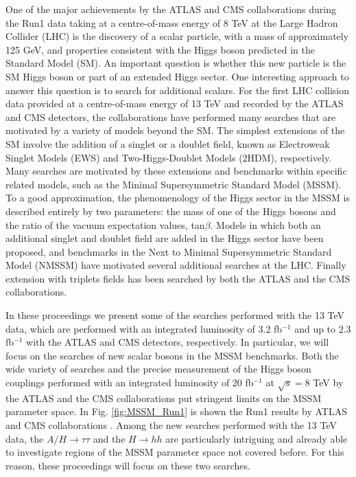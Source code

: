 One of the major achievements by the ATLAS \cite{Aad:2008zzm} and CMS \cite{Chatrchyan:2008aa} collaborations during the Run1 data taking at a centre-of-mass energy of 8 TeV  at the Large Hadron Collider (LHC) is the discovery of a scalar particle, with a mass of approximately 125 GeV, and properties  consistent with the Higgs boson predicted in the Standard Model (SM). 
 An important question is whether this new particle is the SM Higgs boson or part of an extended Higgs sector. One interesting approach to answer this question is to search for additional scalars.
For the first LHC collision data provided at a centre-of-mass energy of 13 TeV and recorded
by the ATLAS and CMS detectors, the collaborations have performed many searches that are
motivated by a variety of models beyond the SM. The simplest extensions of the SM involve the
addition of a singlet or a doublet field, known as Electroweak Singlet Models (EWS)
and Two-Higgs-Doublet Models (2HDM), respectively. Many searches are motivated by these
extensions and benchmarks within specific related models, such as the Minimal Supersymmetric
Standard Model (MSSM). To a good approximation, the phenomenology of the Higgs sector in the MSSM is described entirely by two parameters: the mass of one of the Higgs bosons and the ratio of the vacuum
expectation values, tan$\beta$. Models in which both an additional singlet and doublet field are added in the Higgs sector have been proposed, and benchmarks in the Next to Minimal Supersymmetric
Standard Model (NMSSM) have motivated several additional searches at the LHC. Finally extension with triplets fields has been searched by both the ATLAS and the CMS collaborations.

In these proceedings we present some of the searches performed with the 13 TeV
data, which are performed with an integrated luminosity of 3.2 fb$^{-1}$ and up to 2.3 fb$^{-1}$ with the
ATLAS \cite{ATLAS-CONF-2015-061,HH_bbbb_ATLAS,HH_bbgg_ATLAS,chargedH_tb_ATLAS,chargedH_tuanu_ATLAS} and CMS \cite{HH_bbtautau_CMS,HH_bbWW_CMS,HH_bbbb_CMS} detectors, respectively. In particular, we will focus on the searches of new scalar bosons in the MSSM benchmarks. Both the wide variety of searches and the precise measurement of the Higgs boson couplings  performed with an integrated luminosity of  20 fb$^{-1}$ at $\sqrt{s}=$8 TeV by the ATLAS \cite{aa3photon} and the CMS \cite{Hmumu_ref_CMS,Hbb_ref_CMS,chargedH_tb_CMS,diChargedH} collaborations put stringent limits on the MSSM parameter space. In Fig. \ref{fig:MSSM_Run1} is shown the Run1 results by ATLAS and CMS collaborations \cite{Aad2015,CMS-PAS-HIG-16-007}. Among the new searches performed with the 13 TeV data, the $A/H\rightarrow\tau\tau$ and the $H\rightarrow hh$ are particularly intriguing and already able to investigate regions of the MSSM parameter space not covered before. 
For this reason, these proceedings will focus on these two searches.

